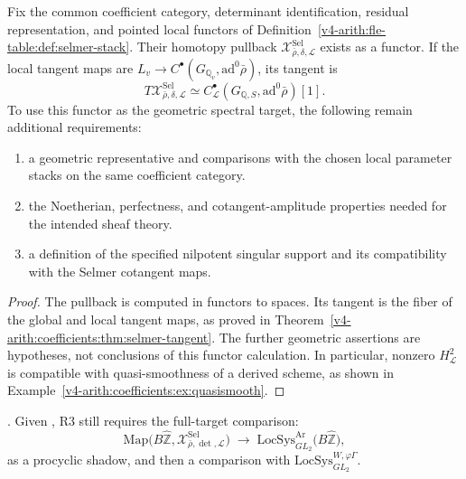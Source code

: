 \begin{theorem}
\label{v4-arith:bzn-sub:thm:R2-main}
Fix the common coefficient category, determinant identification,
residual representation, and pointed local functors of
Definition~\ref{v4-arith:fle-table:def:selmer-stack}. Their homotopy
pullback \(\mathcal X^{\mathrm{Sel}}_{\bar\rho,\delta,\mathcal L}\)
exists as a functor. If the local tangent maps are
\(L_v\to C^\bullet(G_{\mathbb Q_v},\mathrm{ad}^0\bar\rho)\),
its tangent is
\[
 T\mathcal X^{\mathrm{Sel}}_{\bar\rho,\delta,\mathcal L}
 \simeq C^\bullet_{\mathcal L}
        (G_{\mathbb Q,S},\mathrm{ad}^0\bar\rho)[1].
\]
To use this functor as the geometric spectral target, the following
remain additional requirements:
\begin{enumerate}
\item a geometric representative and comparisons with the chosen local
parameter stacks on the same coefficient category.
\item the Noetherian, perfectness, and cotangent-amplitude properties
needed for the intended sheaf theory.
\item a definition of the specified nilpotent singular support and its
compatibility with the Selmer cotangent maps.
\end{enumerate}
\end{theorem}
\begin{proof}
The pullback is computed in functors to spaces. Its tangent is the
fiber of the global and local tangent maps, as proved in
Theorem~\ref{v4-arith:coefficients:thm:selmer-tangent}.
The further geometric assertions are hypotheses, not conclusions of
this functor calculation. In particular, nonzero \(H^2_{\mathcal L}\)
is compatible with quasi-smoothness of a derived scheme, as shown in
Example~\ref{v4-arith:coefficients:ex:quasismooth}.
\end{proof}

\begin{corollary}
\label{v4-arith:bzn-sub:cor:R3-definitional}
\ClaimStatusNeedsVerification. Given
, R3 still requires
the full-target comparison:
\begin{equation}
\mathrm{Map}\bigl(B\widehat{\mathbb{Z}},\mathcal{X}^{\mathrm{Sel}}_{\bar\rho,\det,\mathcal{L}}\bigr)
\;\longrightarrow\;
\mathrm{LocSys}^{\mathrm{Ar}}_{GL_{2}}\bigl(B\widehat{\mathbb{Z}}\bigr),
\end{equation}
as a procyclic shadow, and then a comparison with
\(\mathrm{LocSys}^{W,\varphi\Gamma}_{GL_{2}}\).
\end{corollary}


